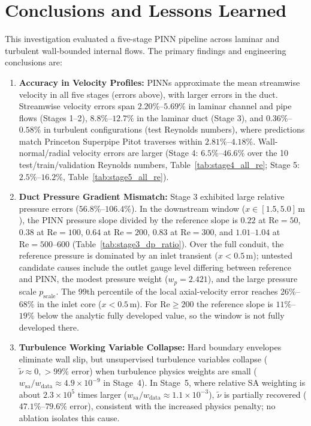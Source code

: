 \documentclass[11pt,a4paper]{article}
\begin{document}
\section{Conclusions and Lessons Learned}
\label{sec:conclusions}
This investigation evaluated a five-stage PINN pipeline across laminar and turbulent wall-bounded internal flows. The primary findings and engineering conclusions are:
\begin{enumerate}[leftmargin=1.5em]
    \item \textbf{Accuracy in Velocity Profiles:} PINNs approximate the mean streamwise velocity in all five stages (errors above), with larger errors in the duct. Streamwise velocity errors span $2.20\%$--$5.69\%$ in laminar channel and pipe flows (Stages 1--2), $8.8\%$--$12.7\%$ in the laminar duct (Stage 3), and $0.36\%$--$0.58\%$ in turbulent configurations (test Reynolds numbers), where predictions match Princeton Superpipe Pitot traverses within $2.81\%$--$4.18\%$. Wall-normal/radial velocity errors are larger (Stage 4: $6.5\%$--$46.6\%$ over the 10 test/train/validation Reynolds numbers, Table~\ref{tab:stage4_all_re}; Stage 5: $2.5\%$--$16.2\%$, Table~\ref{tab:stage5_all_re}).
    \item \textbf{Duct Pressure Gradient Mismatch:} Stage 3 exhibited large relative pressure errors ($56.8\%$--$106.4\%$). In the downstream window ($x \in [1.5, 5.0]\,\text{m}$), the PINN pressure slope divided by the reference slope is $0.22$ at $\mathrm{Re}=50$, $0.38$ at $\mathrm{Re}=100$, $0.64$ at $\mathrm{Re}=200$, $0.83$ at $\mathrm{Re}=300$, and $1.01$--$1.04$ at $\mathrm{Re}=500$--$600$ (Table~\ref{tab:stage3_dp_ratio}). Over the full conduit, the reference pressure is dominated by an inlet transient ($x < 0.5\,\text{m}$); untested candidate causes include the outlet gauge level differing between reference and PINN, the modest pressure weight ($w_p = 2.421$), and the large pressure scale $p_{\mathrm{scale}}$. The 99th percentile of the local axial-velocity error reaches 26\%--68\% in the inlet core ($x < 0.5\,\text{m}$). For $\mathrm{Re} \ge 200$ the reference slope is $11\%$--$19\%$ below the analytic fully developed value, so the window is not fully developed there.
    \item \textbf{Turbulence Working Variable Collapse:} Hard boundary envelopes eliminate wall slip, but unsupervised turbulence variables collapse ($\tilde{\nu} \approx 0, >99\%$ error) when turbulence physics weights are small ($w_{\mathrm{sa}}/w_{\mathrm{data}} \approx 4.9\times 10^{-9}$ in Stage~4). In Stage~5, where relative SA weighting is about $2.3\times 10^5$ times larger ($w_{\mathrm{sa}}/w_{\mathrm{data}} \approx 1.1\times 10^{-3}$), $\tilde{\nu}$ is partially recovered ($47.1\%$--$79.6\%$ error), consistent with the increased physics penalty; no ablation isolates this cause.

\end{enumerate}
\end{document}
